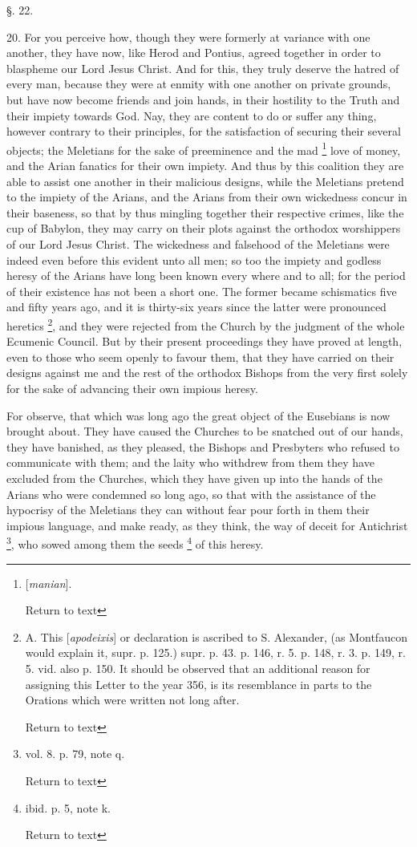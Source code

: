 §. 22.

20. For you perceive how, though they were
formerly at variance with one another, they have now, like Herod and
Pontius, agreed together in order to blaspheme our Lord Jesus Christ.
And for this, they truly deserve the hatred of every man, because they
were at enmity with one another on private grounds, but have now
become friends and join hands, in their hostility to the Truth and
their impiety towards God. Nay, they are content to do or suffer any
thing, however contrary to their principles, for the satisfaction of
securing their several objects; the Meletians for the sake of
preeminence and the mad \footnote{[\emph{manian}].

Return to text} love of
money, and the Arian fanatics for their own impiety. And thus by this
coalition they are able to assist one another in their malicious
designs, while the Meletians pretend to the impiety of the Arians, and
the Arians from their own wickedness concur in their baseness, so that
by thus mingling together their respective crimes, like the cup of
Babylon, they may carry on their plots against the orthodox
worshippers of our Lord Jesus Christ. The wickedness and falsehood of
the Meletians were indeed even before this evident unto all men; so
too the impiety and godless heresy of the Arians have long been known
every where and to all; for the period of their existence has not been
a short one. The former became schismatics five and fifty years ago,
and it is thirty-six years since the latter were pronounced heretics \footnote{A.
This [\emph{apodeixis}] or declaration is ascribed to S. Alexander,
(as Montfaucon would explain it, supr. p. 125.) supr. p. 43. p. 146,
r. 5. p. 148, r. 3. p. 149, r. 5. vid. also p. 150. It should be
observed that an additional reason for assigning this Letter to the
year 356, is its resemblance in parts to the Orations which were
written not long after.

Return to text

}, and they were rejected from the Church by the judgment of the
whole Ecumenic Council. But by their present proceedings they have
proved at length, even to those who seem openly to favour them, that
they have carried on their designs against me and the rest of the
orthodox Bishops from the very first solely for the sake of advancing
their own impious heresy.

For observe, that which was long ago the great
object of the Eusebians is now brought about. They have caused
the Churches to be snatched out of our hands, they have banished, as
they pleased, the Bishops and Presbyters who refused to communicate
with them; and the laity who withdrew from them they have excluded
from the Churches, which they have given up into the hands of the
Arians who were condemned so long ago, so that with the assistance of
the hypocrisy of the Meletians they can without fear pour forth in
them their impious language, and make ready, as they think, the way of
deceit for Antichrist \footnote{vol. 8. p. 79, note q.

Return to text}, who sowed
among them the seeds \footnote{ibid. p. 5, note k.

Return to text} of this heresy.

